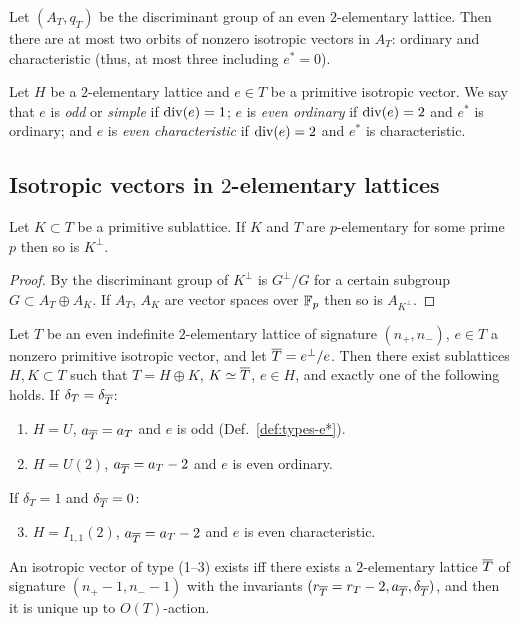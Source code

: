 \documentclass{amsart}
\begin{document}
\begin{lemma}
  \label{lem:disc-0-cusps}
  Let $(A_T,q_T)$ be the discriminant group of an even $2$-elementary
  lattice. Then there are at most two orbits of nonzero isotropic
  vectors in $A_T$: ordinary and characteristic (thus, at most three
  including $e^*=0$).
\end{lemma}

\begin{definition}\label{def:types-e*}
  Let $H$ be a $2$-elementary lattice and $e\in T$ be a primitive
  isotropic vector. We say that $e$ is \emph{odd} or \emph{simple} if
  $\operatorname{div}(e)=1$; $e$ is \emph{even ordinary} if $\operatorname{div}(e)=2$ and $e^*$ is
  ordinary; and $e$ is \emph{even characteristic} if $\operatorname{div}(e)=2$ and
  $e^*$ is characteristic.
\end{definition}

\subsection{Isotropic vectors in $2$-elementary lattices}
\label{sec:iso-T}

\begin{lemma}\label{lem:perp-p-elem}
  Let $K\subset T$ be a primitive sublattice. If $K$ and $T$ are
  $p$-elementary for some prime $p$ then so is $K^\perp$.
\end{lemma}
\begin{proof}
  By \cite[1.15.1]{nikulin1979integer-symmetric} the discriminant
  group of $K^\perp$ is $G^\perp/G$ for a
  certain subgroup $G \subset A_T \oplus A_K$. If $A_T$,
  $A_K$ are vector spaces over ${\mathbb F}_p$ then so is $A_{K^\perp}$.
\end{proof}

\begin{proposition}%
  \label{prop:isotropic-vecs}
  Let $T$ be an even indefinite $2$-elementary lattice
  of signature $(n_+,n_-)$,
  $e\in T$ a nonzero primitive isotropic vector, and let
  ${\overline T} = e^\perp/e$. Then there exist sublattices $H,K\subset T$ such
  that $T=H\oplus K$, $K\simeq{\overline T}$, $e\in H$, and exactly one of the
  following holds.
  \noindent If $\delta_T=\delta_{\overline T}$: 
  \begin{enumerate}
  \item $H=U$,  $a_{\overline T}=a_T$ and $e$ is odd
    (Def.~\ref{def:types-e*}). 
  \item $H=U(2)$,  $a_{\overline T} = a_T-2$ and $e$ is even ordinary.
  \end{enumerate}
  If $\delta_T=1$ and $\delta_{\overline T}=0$: 
  \begin{enumerate}\setcounter{enumi}{2}
  \item $H=I_{1,1}(2)$, $a_{\overline T} = a_T-2$ and $e$ is even characteristic.
  \end{enumerate}

  An isotropic vector of type (1--3) exists iff there exists a
  $2$-elementary lattice ${\overline T}$ of signature $(n_+-1,n_--1)$ with the
  invariants $(r_{\overline T}=r_T-2, a_{\overline T}, \delta_{\overline T})$, and then it is unique
  up to $O(T)$-action.
\end{proposition}
\end{document}
